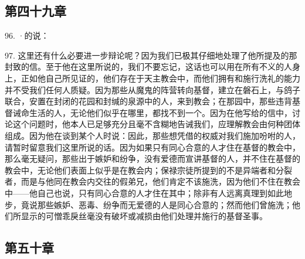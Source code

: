 
\subsection{第四十九章}

96. ·的说：\par

97. 这里还有什么必要进一步辩论呢？因为我们已极其仔细地处理了他所提及的那封致的信。至于他在这里所说的，我们不要忘记，这话也可以用在所有不义的人身上，正如他自己所见证的，他们存在于天主教会中，而他们拥有和施行洗礼的能力并不受我们任何人质疑。因为那些从魔鬼的阵营转向基督，建立在磐石上，与鸽子联合，安置在封闭的花园和封缄的泉源中的人，来到教会；在那园中，那些违背基督诫命生活的人，无论他们似乎在哪里，都找不到一个。因为在他写给的信中，讨论这个问题时，他本人已足够充分且毫不含糊地告诫我们，应理解教会由何种团体组成。因为他在谈到某个人时说：因此，那些想凭借的权威对我们施加吩咐的人，请暂时留意我们这里所说的话。因为如果只有同心合意的人才住在基督的教会中，那么毫无疑问，那些出于嫉妒和纷争，没有爱德而宣讲基督的人，并不住在基督的教会中，无论他们表面上似乎是在教会内；保禄宗徒所提到的不是异端者和分裂者，而是与他同在教会内交往的假弟兄，他们肯定不该施洗，因为他们不住在教会中——他自己也说，只有同心合意的人才住在其中；除非有人远离真理到如此地步，竟说那些嫉妒、恶毒、纷争而无爱德的人是同心合意的；然而他们曾施洗；他们所显示的可憎乖戾丝毫没有破坏或减损由他们处理并施行的基督圣事。\par


\subsection{第五十章}

